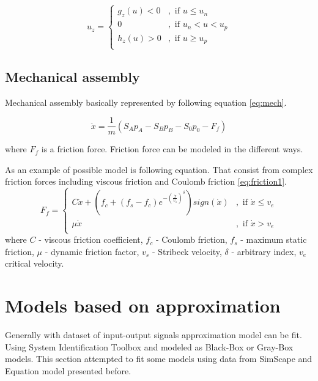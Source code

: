 \documentclass[class=article, crop=false]{standalone}
\begin{document}
\begin{equation}
    u_z = 
    \begin{cases}
        g_z(u) < 0 &, \text{ if } u \le u_n \\
        0          &, \text{ if } u_n < u < u_p \\
        h_z(u) > 0 &, \text{ if } u \ge u_p \\
    \end{cases}  
    \label{eq:deadzone}
\end{equation}

\subsection{Mechanical assembly}\label{sec:mech_assembly}
Mechanical assembly basically represented by following equation
\ref{eq:mech}.

\begin{equation}
    \ddot{x} = \frac{1}{m}\left(S_A p_A - S_B p_B - S_0 p_0 - F_f \right)
    \label{eq:mech}
\end{equation}

where $F_f$ is a friction force. Friction force can be modeled in the
different ways.

As an example of possible model is following equation. That consist from
complex friction forces including viscous friction and Coulomb friction
\ref{eq:friction1}.
\begin{equation}
    F_f = 
    \begin{cases}
        C \dot{x} + \left(f_c + (f_s-f_c)
        e^{-\left(\frac{\dot{x}}{v_s}\right)^{\delta}}\right) sign(\dot{x}) &,
        \text{ if } \dot{x} \le v_e \\
        \mu \dot{x} &,
        \text{ if } \dot{x} > v_e \\
    \end{cases}
    \label{eq:friction1}
\end{equation}
where $C$ - viscous friction coefficient, $f_c$ - Coulomb friction, $f_s$ -
maximum static friction, $\mu$ - dynamic friction factor, $v_s$ - Stribeck velocity,
$\delta$ - arbitrary index, $v_e$ critical velocity.



\section{Models based on approximation}
Generally with dataset of input-output signals approximation model can be
fit. Using System Identification Toolbox and modeled as Black-Box or
Gray-Box models. This section attempted to fit some models using data from
SimScape and Equation model presented before.
\end{document}
